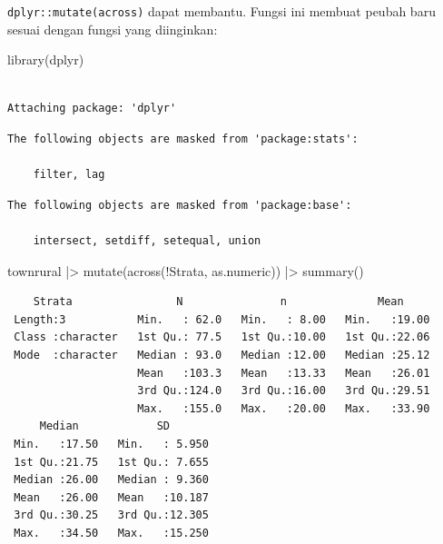 \documentclass[
  letterpaper,
  DIV=11,
  numbers=noendperiod]{scrreprt}
\newenvironment{Shaded}{\begin{snugshade}}{\end{snugshade}}
\newcommand{\FunctionTok}[1]{\textcolor[rgb]{0.28,0.35,0.67}{#1}}
\newcommand{\NormalTok}[1]{\textcolor[rgb]{0.00,0.23,0.31}{#1}}
\newcommand{\SpecialCharTok}[1]{\textcolor[rgb]{0.37,0.37,0.37}{#1}}
\begin{document}
\texttt{dplyr::mutate(across)} dapat membantu. Fungsi ini membuat peubah
baru sesuai dengan fungsi yang diinginkan:

\begin{Shaded}
\begin{Highlighting}[]
\FunctionTok{library}\NormalTok{(dplyr)}
\end{Highlighting}
\end{Shaded}

\begin{verbatim}

Attaching package: 'dplyr'
\end{verbatim}

\begin{verbatim}
The following objects are masked from 'package:stats':

    filter, lag
\end{verbatim}

\begin{verbatim}
The following objects are masked from 'package:base':

    intersect, setdiff, setequal, union
\end{verbatim}

\begin{Shaded}
\begin{Highlighting}[]
\NormalTok{townrural }\SpecialCharTok{|\textgreater{}} \FunctionTok{mutate}\NormalTok{(}\FunctionTok{across}\NormalTok{(}\SpecialCharTok{!}\NormalTok{Strata, as.numeric)) }\SpecialCharTok{|\textgreater{}} \FunctionTok{summary}\NormalTok{()}
\end{Highlighting}
\end{Shaded}

\begin{verbatim}
    Strata                N               n              Mean      
 Length:3           Min.   : 62.0   Min.   : 8.00   Min.   :19.00  
 Class :character   1st Qu.: 77.5   1st Qu.:10.00   1st Qu.:22.06  
 Mode  :character   Median : 93.0   Median :12.00   Median :25.12  
                    Mean   :103.3   Mean   :13.33   Mean   :26.01  
                    3rd Qu.:124.0   3rd Qu.:16.00   3rd Qu.:29.51  
                    Max.   :155.0   Max.   :20.00   Max.   :33.90  
     Median            SD        
 Min.   :17.50   Min.   : 5.950  
 1st Qu.:21.75   1st Qu.: 7.655  
 Median :26.00   Median : 9.360  
 Mean   :26.00   Mean   :10.187  
 3rd Qu.:30.25   3rd Qu.:12.305  
 Max.   :34.50   Max.   :15.250  
\end{verbatim}
\end{document}
